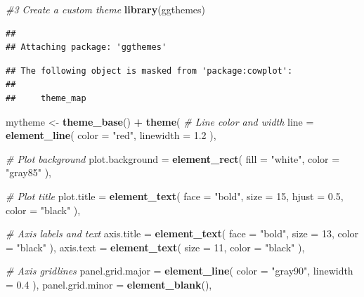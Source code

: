 \documentclass[
]{article}
\newenvironment{Shaded}{\begin{snugshade}}{\end{snugshade}}
\newcommand{\AttributeTok}[1]{\textcolor[rgb]{0.13,0.29,0.53}{#1}}
\newcommand{\CommentTok}[1]{\textcolor[rgb]{0.56,0.35,0.01}{\textit{#1}}}
\newcommand{\DecValTok}[1]{\textcolor[rgb]{0.00,0.00,0.81}{#1}}
\newcommand{\FloatTok}[1]{\textcolor[rgb]{0.00,0.00,0.81}{#1}}
\newcommand{\FunctionTok}[1]{\textcolor[rgb]{0.13,0.29,0.53}{\textbf{#1}}}
\newcommand{\NormalTok}[1]{#1}
\newcommand{\OtherTok}[1]{\textcolor[rgb]{0.56,0.35,0.01}{#1}}
\newcommand{\SpecialCharTok}[1]{\textcolor[rgb]{0.81,0.36,0.00}{\textbf{#1}}}
\newcommand{\StringTok}[1]{\textcolor[rgb]{0.31,0.60,0.02}{#1}}
\begin{document}
\begin{Shaded}
\begin{Highlighting}[]
\CommentTok{\#3 Create a custom theme}
\FunctionTok{library}\NormalTok{(ggthemes)}
\end{Highlighting}
\end{Shaded}

\begin{verbatim}
## 
## Attaching package: 'ggthemes'
\end{verbatim}

\begin{verbatim}
## The following object is masked from 'package:cowplot':
## 
##     theme_map
\end{verbatim}

\begin{Shaded}
\begin{Highlighting}[]
\NormalTok{mytheme }\OtherTok{\textless{}{-}} \FunctionTok{theme\_base}\NormalTok{() }\SpecialCharTok{+}
  \FunctionTok{theme}\NormalTok{(}
    \CommentTok{\# Line color and width}
    \AttributeTok{line =} \FunctionTok{element\_line}\NormalTok{(}
      \AttributeTok{color =} \StringTok{"red"}\NormalTok{,}
      \AttributeTok{linewidth =} \FloatTok{1.2}
\NormalTok{    ),}
    
    \CommentTok{\# Plot background}
    \AttributeTok{plot.background =} \FunctionTok{element\_rect}\NormalTok{(}
      \AttributeTok{fill =} \StringTok{"white"}\NormalTok{,}
      \AttributeTok{color =} \StringTok{"gray85"}
\NormalTok{    ),}
    
    \CommentTok{\# Plot title}
    \AttributeTok{plot.title =} \FunctionTok{element\_text}\NormalTok{(}
      \AttributeTok{face =} \StringTok{"bold"}\NormalTok{,}
      \AttributeTok{size =} \DecValTok{15}\NormalTok{,}
      \AttributeTok{hjust =} \FloatTok{0.5}\NormalTok{,}
      \AttributeTok{color =} \StringTok{"black"}
\NormalTok{    ),}
    
    \CommentTok{\# Axis labels and text}
    \AttributeTok{axis.title =} \FunctionTok{element\_text}\NormalTok{(}
      \AttributeTok{face =} \StringTok{"bold"}\NormalTok{,}
      \AttributeTok{size =} \DecValTok{13}\NormalTok{,}
      \AttributeTok{color =} \StringTok{"black"}
\NormalTok{    ),}
    \AttributeTok{axis.text =} \FunctionTok{element\_text}\NormalTok{(}
      \AttributeTok{size =} \DecValTok{11}\NormalTok{,}
      \AttributeTok{color =} \StringTok{"black"}
\NormalTok{    ),}
    
    \CommentTok{\# Axis gridlines}
    \AttributeTok{panel.grid.major =} \FunctionTok{element\_line}\NormalTok{(}
      \AttributeTok{color =} \StringTok{"gray90"}\NormalTok{,}
      \AttributeTok{linewidth =} \FloatTok{0.4}
\NormalTok{    ),}
    \AttributeTok{panel.grid.minor =} \FunctionTok{element\_blank}\NormalTok{(),}
    

\end{Highlighting}
\end{Shaded}
\end{document}
